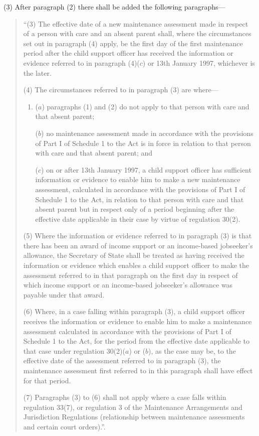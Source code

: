 \documentclass[12pt,a4paper]{article}
\begin{document}
(3) After paragraph (2) there shall be added the following paragraphs—
\begin{quotation}
“(3) The effective date of a new maintenance assessment made in respect of a person with care and an absent parent shall, where the circumstances set out in paragraph (4) apply, be the first day of the first maintenance period after the child support officer has received the information or evidence referred to in paragraph (4)($c$) or 13th January 1997, whichever is the later.

\begin{sloppypar}
(4) The circumstances referred to in paragraph (3) are where—
\end{sloppypar}
\begin{enumerate}\item[]
($a$) paragraphs (1) and (2) do not apply to that person with care and that absent parent;

($b$) no maintenance assessment made in accordance with the provisions of Part I of Schedule 1 to the Act is in force in relation to that person with care and that absent parent; and

($c$) on or after 13th January 1997, a child support officer has sufficient information or evidence to enable him to make a new maintenance assessment, calculated in accordance with the provisions of Part I of Schedule 1 to the Act, in relation to that person with care and that absent parent but in respect only of a period beginning after the effective date applicable in their case by virtue of regulation 30(2).
\end{enumerate}

(5) Where the information or evidence referred to in paragraph (3) is that there has been an award of income support or an income-based jobseeker’s allowance, the Secretary of State shall be treated as having received the information or evidence which enables a child support officer to make the assessment referred to in that paragraph on the first day in respect of which income support or an income-based jobseeker’s allowance was payable under that award.

(6) Where, in a case falling within paragraph (3), a child support officer receives the information or evidence to enable him to make a maintenance assessment calculated in accordance with the provisions of Part I of Schedule 1 to the Act, for the period from the effective date applicable to that case under regulation 30(2)($a$) or ($b$), as the case may be, to the effective date of the assessment referred to in paragraph (3), the maintenance assessment first referred to in this paragraph shall have effect for that period.

(7) Paragraphs (3) to (6) shall not apply where a case falls within regulation 33(7), or regulation 3 of the Maintenance Arrangements and Jurisdiction Regulations (relationship between maintenance assessments and certain court orders).”.
\end{quotation}
\end{document}
